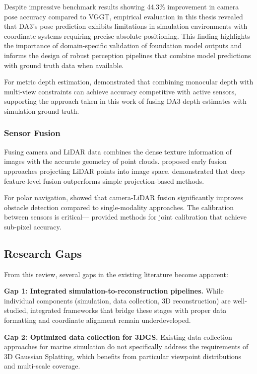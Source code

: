 Despite impressive benchmark results showing 44.3\% improvement in camera pose accuracy compared to VGGT, empirical evaluation in this thesis revealed that DA3's pose prediction exhibits limitations in simulation environments with coordinate systems requiring precise absolute positioning. This finding highlights the importance of domain-specific validation of foundation model outputs and informs the design of robust perception pipelines that combine model predictions with ground truth data when available.

For metric depth estimation, \citeauthor{ranftl2020towards} demonstrated that combining monocular depth with multi-view constraints can achieve accuracy competitive with active sensors, supporting the approach taken in this work of fusing DA3 depth estimates with simulation ground truth.

\subsubsection{Sensor Fusion}

Fusing camera and LiDAR data combines the dense texture information of images with the accurate geometry of point clouds. \citeauthor{shao2019pfr} proposed early fusion approaches projecting LiDAR points into image space. \citeauthor{liang2018deep} demonstrated that deep feature-level fusion outperforms simple projection-based methods.

For polar navigation, \citeauthor{meng2018uav} showed that camera-LiDAR fusion significantly improves obstacle detection compared to single-modality approaches. The calibration between sensors is critical---\citeauthor{geiger2012automatic} provided methods for joint calibration that achieve sub-pixel accuracy.

\subsection{Research Gaps}

From this review, several gaps in the existing literature become apparent:

\textbf{Gap 1: Integrated simulation-to-reconstruction pipelines.} While individual components (simulation, data collection, 3D reconstruction) are well-studied, integrated frameworks that bridge these stages with proper data formatting and coordinate alignment remain underdeveloped.

\textbf{Gap 2: Optimized data collection for 3DGS.} Existing data collection approaches for marine simulation do not specifically address the requirements of 3D Gaussian Splatting, which benefits from particular viewpoint distributions and multi-scale coverage.

